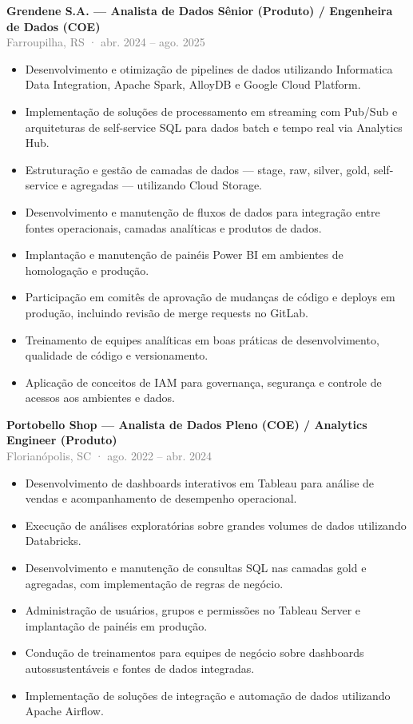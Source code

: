 \documentclass[10pt,a4paper]{article}
\newcommand{\role}[3]{%
  \Needspace{13\baselineskip}%
  \textbf{#1}\\[-1pt]
  {\small\textcolor{grey}{#2}}\\[-1pt]
  #3\par}
\begin{document}
\role{Grendene S.A. — Analista de Dados Sênior (Produto) / Engenheira de Dados (COE)}{Farroupilha, RS · abr. 2024 – ago. 2025}{
\begin{itemize}
  \item Desenvolvimento e otimização de pipelines de dados utilizando Informatica Data Integration, Apache Spark, AlloyDB e Google Cloud Platform.
  \item Implementação de soluções de processamento em streaming com Pub/Sub e arquiteturas de self-service SQL para dados batch e tempo real via Analytics Hub.
  \item Estruturação e gestão de camadas de dados — stage, raw, silver, gold, self-service e agregadas — utilizando Cloud Storage.
  \item Desenvolvimento e manutenção de fluxos de dados para integração entre fontes operacionais, camadas analíticas e produtos de dados.
  \item Implantação e manutenção de painéis Power BI em ambientes de homologação e produção.
  \item Participação em comitês de aprovação de mudanças de código e deploys em produção, incluindo revisão de merge requests no GitLab.
  \item Treinamento de equipes analíticas em boas práticas de desenvolvimento, qualidade de código e versionamento.
  \item Aplicação de conceitos de IAM para governança, segurança e controle de acessos aos ambientes e dados.
\end{itemize}}

\role{Portobello Shop — Analista de Dados Pleno (COE) / Analytics Engineer (Produto)}{Florianópolis, SC · ago. 2022 – abr. 2024}{
\begin{itemize}
  \item Desenvolvimento de dashboards interativos em Tableau para análise de vendas e acompanhamento de desempenho operacional.
  \item Execução de análises exploratórias sobre grandes volumes de dados utilizando Databricks.
  \item Desenvolvimento e manutenção de consultas SQL nas camadas gold e agregadas, com implementação de regras de negócio.
  \item Administração de usuários, grupos e permissões no Tableau Server e implantação de painéis em produção.
  \item Condução de treinamentos para equipes de negócio sobre dashboards autossustentáveis e fontes de dados integradas.
  \item Implementação de soluções de integração e automação de dados utilizando Apache Airflow.
\end{itemize}}
\end{document}
